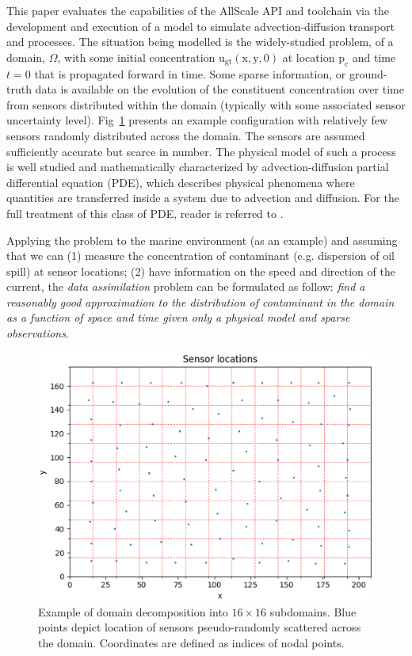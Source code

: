 \documentclass[acmsmall,review,anonymous]{acmart}\settopmatter{printfolios=true,printccs=false,printacmref=false}
\begin{document}
This paper evaluates the capabilities of the AllScale API and toolchain via the development and execution of a model to simulate advection-diffusion transport and processes. The situation being modelled is the widely-studied problem, of a domain, $\Omega$, with some initial concentration $\mathrm{u_{gt}(x,y,0)}$ at location $\mathrm{p_c}$ and time $t=0$ that is propagated forward in time. Some sparse information, or ground-truth data is available on the evolution of the constituent concentration over time from sensors distributed within the domain (typically with some associated sensor uncertainty level). Fig~\ref{fig:sensors} presents an example configuration with relatively few sensors randomly distributed across the domain. The sensors are assumed sufficiently accurate but scarce in number. The physical model of such a process is well studied and mathematically characterized by advection-diffusion partial differential equation (PDE), which describes physical phenomena where quantities are transferred inside a system due to advection and diffusion. For the full treatment of this class of PDE, reader is referred to \cite{Hundsdorfer03}.

Applying the problem to the marine environment (as an example) and assuming that we can (1) measure the concentration of contaminant (e.g. dispersion of oil spill) at sensor locations; (2) have information on the speed and direction of the current, the \textit{data assimilation} problem can be formulated as follow: \textit{find a reasonably good approximation to the distribution of contaminant in the domain as a function of space and time given only a physical model and sparse observations}.

\begin{figure}
\includegraphics[scale=0.5]{images/sensors-Nx208-Ny176}
\caption{Example of domain decomposition into ${16{\times}16}$ subdomains. Blue points depict location of sensors pseudo-randomly scattered across the domain. Coordinates are defined as indices of nodal points.}
\label{fig:sensors}
\end{figure}
\end{document}
